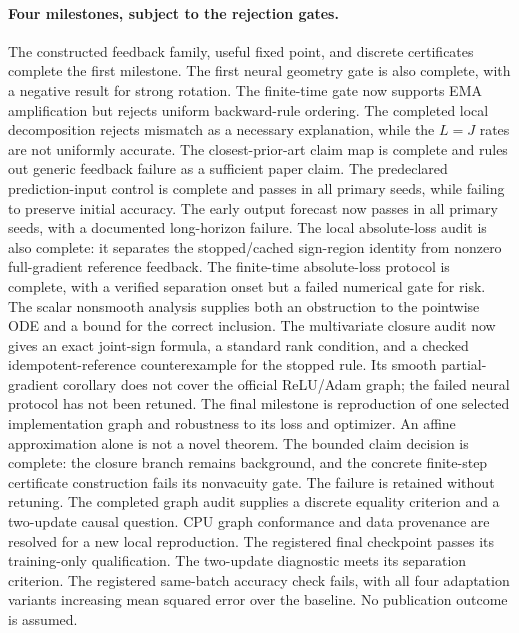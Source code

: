 \documentclass[11pt,a4paper]{article}
\begin{document}
\paragraph{Four milestones, subject to the rejection gates.}
The constructed feedback family, useful fixed point, and discrete
certificates complete the first milestone. The first neural geometry gate
is also complete, with a negative result for strong rotation. The finite-time
gate now supports EMA amplification but rejects uniform backward-rule
ordering. The completed local decomposition rejects mismatch as a
necessary explanation, while the $L=J$ rates are not uniformly
accurate. The closest-prior-art claim map is complete and rules out
generic feedback failure as a sufficient paper claim. The predeclared
prediction-input control is complete and passes in all primary seeds,
while failing to preserve initial accuracy. The early output forecast
now passes in all primary seeds, with a documented long-horizon failure.
The local absolute-loss audit is also complete: it separates the
stopped/cached sign-region identity from nonzero full-gradient reference
feedback. The finite-time absolute-loss protocol is complete, with a
verified separation onset but a failed numerical gate for risk. The
scalar nonsmooth analysis supplies both an obstruction to the pointwise
ODE and a bound for the correct inclusion. The multivariate closure audit
now gives an exact joint-sign formula, a standard rank condition, and
a checked idempotent-reference counterexample for the stopped rule.
Its smooth partial-gradient corollary does not cover the official
ReLU/Adam graph; the failed neural protocol has not been retuned.
The final milestone is reproduction of one selected implementation graph
and robustness to its loss and optimizer. An affine approximation alone is not a novel theorem.
The bounded claim decision is complete: the closure branch remains
background, and the concrete finite-step certificate construction fails
its nonvacuity gate. The failure is retained without retuning. The completed
graph audit supplies a discrete equality criterion and a two-update causal
question. CPU graph conformance and data provenance are resolved for a
new local reproduction. The registered final checkpoint passes its
training-only qualification. The two-update diagnostic meets its separation
criterion. The registered same-batch accuracy check fails, with all four
adaptation variants increasing mean squared error over the baseline.
No publication outcome is assumed.
\end{document}
